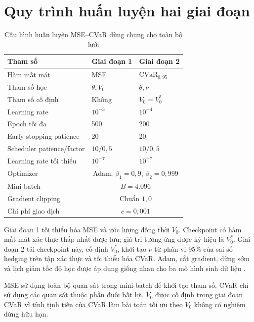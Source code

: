 \section{Quy trình huấn luyện hai giai đoạn}
\label{sec:c3-curriculum}

\begin{table}[H]
\centering
\small
\caption{Cấu hình huấn luyện MSE--CVaR dùng chung cho toàn bộ lưới}
\label{tab:c3-hyperparameters}
\begin{tabular}{@{}lll@{}}
\toprule
\textbf{Tham số} & \textbf{Giai đoạn 1} & \textbf{Giai đoạn 2}\\
\midrule
Hàm mất mát & MSE & $\mathrm{CVaR}_{0{,}95}$\\
Tham số học & $\theta,V_0$ & $\theta,\nu$\\
Tham số cố định & Không & $V_0=V_0^{*}$\\
Learning rate & $10^{-3}$ & $10^{-4}$\\
Epoch tối đa & 500 & 200\\
Early-stopping patience & 20 & 20\\
Scheduler patience/factor & $10/0{,}5$ & $10/0{,}5$\\
Learning rate tối thiểu & $10^{-7}$ & $10^{-7}$\\
\midrule
Optimizer & \multicolumn{2}{c}{Adam, $\beta_1=0{,}9$, $\beta_2=0{,}999$}\\
Mini-batch & \multicolumn{2}{c}{$B=4.096$}\\
Gradient clipping & \multicolumn{2}{c}{Chuẩn $1{,}0$}\\
Chi phí giao dịch & \multicolumn{2}{c}{$c=0{,}001$}\\
\bottomrule
\end{tabular}
\end{table}

Giai đoạn 1 tối thiểu hóa MSE và ước lượng đồng thời $V_0$. Checkpoint có hàm
mất mát xác thực thấp nhất được lưu; giá trị tương ứng được ký hiệu là
$V_0^{*}$. Giai đoạn 2 tải checkpoint này, cố định $V_0^{*}$, khởi tạo $\nu$
từ phân vị 95\% của sai số hedging trên tập xác thực và tối thiểu hóa CVaR.
Adam, cắt gradient, dừng sớm và lịch giảm tốc độ học được áp dụng giống nhau
cho ba mô hình sinh dữ liệu \parencite{KingmaBa2015}.

MSE sử dụng toàn bộ quan sát trong mini-batch để khởi tạo tham số. CVaR chỉ sử
dụng các quan sát thuộc phần đuôi bất lợi. $V_0$ được cố định trong giai đoạn
CVaR vì tính tịnh tiến của CVaR làm bài toán tối ưu theo $V_0$ không có nghiệm
dừng hữu hạn.

